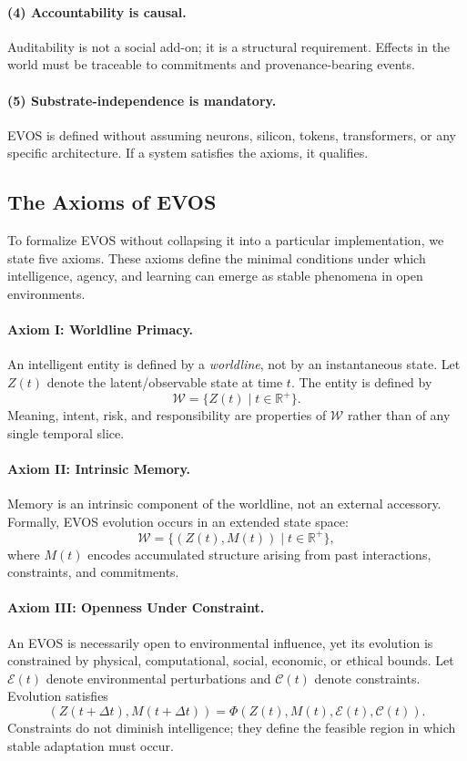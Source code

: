 \documentclass[11pt]{article}
\begin{document}
\paragraph{(4) Accountability is causal.}
Auditability is not a social add-on; it is a structural requirement. Effects in the world
must be traceable to commitments and provenance-bearing events.

\paragraph{(5) Substrate-independence is mandatory.}
EVOS is defined without assuming neurons, silicon, tokens, transformers, or any specific
architecture. If a system satisfies the axioms, it qualifies.

\vspace{0.75em}
\subsection{The Axioms of EVOS}

To formalize EVOS without collapsing it into a particular implementation, we state five
axioms. These axioms define the minimal conditions under which intelligence, agency, and
learning can emerge as stable phenomena in open environments.

\paragraph{Axiom I: Worldline Primacy.}
An intelligent entity is defined by a \emph{worldline}, not by an instantaneous state.
Let $Z(t)$ denote the latent/observable state at time $t$. The entity is defined by
\[
\mathcal{W} = \{ Z(t) \mid t \in \mathbb{R}^+ \}.
\]
Meaning, intent, risk, and responsibility are properties of $\mathcal{W}$ rather than of
any single temporal slice.

\paragraph{Axiom II: Intrinsic Memory.}
Memory is an intrinsic component of the worldline, not an external accessory.
Formally, EVOS evolution occurs in an extended state space:
\[
\mathcal{W} = \{ (Z(t), M(t)) \mid t \in \mathbb{R}^+ \},
\]
where $M(t)$ encodes accumulated structure arising from past interactions, constraints,
and commitments.

\paragraph{Axiom III: Openness Under Constraint.}
An EVOS is necessarily open to environmental influence, yet its evolution is constrained
by physical, computational, social, economic, or ethical bounds. Let $\mathcal{E}(t)$
denote environmental perturbations and $\mathcal{C}(t)$ denote constraints. Evolution
satisfies
\[
(Z(t+\Delta t), M(t+\Delta t)) =
\Phi(Z(t), M(t), \mathcal{E}(t), \mathcal{C}(t)).
\]
Constraints do not diminish intelligence; they define the feasible region in which stable
adaptation must occur.
\end{document}
